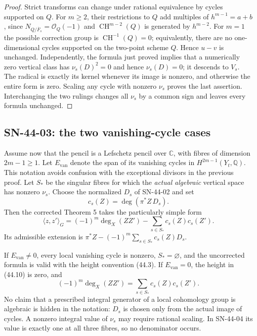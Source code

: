 \begin{proof}
Strict transforms can change under rational equivalence by cycles
supported on $Q$.  For $m\ge2$, their restrictions to $Q$ add
multiples of $h^{m-1}=a+b$, since
$N_{Q/\overline F_s}=\mathcal O_Q(-1)$ and
$\operatorname{CH}^{m-2}(Q)$ is generated by $h^{m-2}$.
For $m=1$ the possible correction group is
$\operatorname{CH}^{-1}(Q)=0$; equivalently, there are no
one-dimensional cycles supported on the two-point scheme $Q$.
Hence $u-v$ is unchanged.  Independently, the formula just proved implies
that a numerically zero vertical class has $\nu_s(D)^2=0$ and hence
$\nu_s(D)=0$; it descends to $V_s$.  The radical is exactly its
kernel whenever its image is nonzero, and otherwise the entire
form is zero.  Scaling any cycle with nonzero $\nu_s$ proves the
last assertion.  Interchanging the two rulings changes all $\nu_s$
by a common sign and leaves every formula unchanged.
\end{proof}

\subsection{SN-44-03: the two vanishing-cycle cases}
\label{sn:44-03}

Assume now that the pencil is a Lefschetz pencil over $\mathbb C$,
with fibres of dimension $2m-1\ge1$.  Let $E_{\mathrm{van}}$ denote
the span of its vanishing cycles in $H^{2m-1}(Y_t,\mathbb Q)$.
This notation avoids confusion with the exceptional divisors in the
previous proof.  Let $S_*$ be the singular fibres for which the
\emph{actual algebraic} vertical space has nonzero $\nu_s$.
Choose the normalized $D_s$ of SN-44-02 and set
\[
 c_s(Z)=\deg(\pi^*Z\,D_s).
\]
Then the corrected Theorem 5 takes the particularly simple form
\[
 \boxed{\quad
 \langle z,z'\rangle_G
   =(-1)^m\deg_X(ZZ')-\sum_{s\in S_*}c_s(Z)c_s(Z').
 \quad}                                                    \tag{44.10}
 \label{eq:44-node-correction}
\]
Its admissible extension is
$\pi^*Z-(-1)^m\sum_{s\in S_*}c_s(Z)D_s$.

If $E_{\mathrm{van}}\ne0$, every local vanishing cycle is nonzero,
$S_*=\varnothing$, and the uncorrected formula is valid with the
height convention (44.3).  If $E_{\mathrm{van}}=0$, the height in
(44.10) is zero, and
\[
 (-1)^m\deg_X(ZZ')=\sum_{s\in S_*}c_s(Z)c_s(Z').             \tag{44.11}
\]
No claim that a prescribed integral generator of a local cohomology
group is algebraic is hidden in the notation: $D_s$ is chosen only
from the actual image of cycles.  A nonzero integral value of
$\nu_s$ may require rational scaling.  In SN-44-04 its value is
exactly one at all three fibres, so no denominator occurs.

